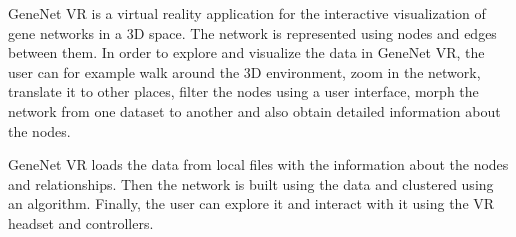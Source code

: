 %
%



GeneNet VR is a virtual reality application for the interactive visualization of gene networks in a 3D space. The network is represented using nodes and edges between them. In order to explore and visualize the data in GeneNet VR, the user can for example walk around the 3D environment, zoom in the network, translate it to other places, filter the nodes using a user interface, morph the network from one dataset to another and also obtain detailed information about the nodes.

GeneNet VR loads the data from local files with the information about the nodes and relationships. Then the network is built using the data and clustered using an algorithm. Finally, the user can explore it and interact with it using the VR headset and controllers.

